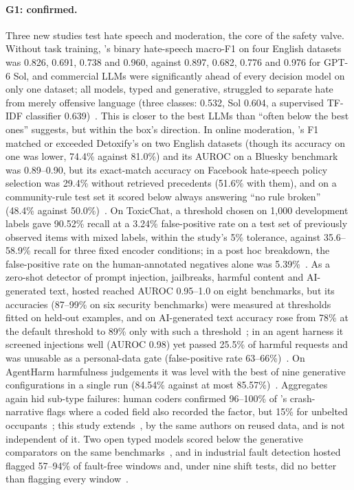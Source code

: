 \paragraph{G1: confirmed.}
Three new studies test hate speech and moderation, the core of the safety valve.
Without task training, \jev{}'s binary hate-speech macro-F1 on four English datasets was 0.826, 0.691, 0.738 and 0.960, against 0.897, 0.682, 0.776 and 0.976 for GPT-6 Sol, and commercial LLMs were significantly ahead of every decision model on only one dataset; all models, typed and generative, struggled to separate hate from merely offensive language (three classes: \jev{} 0.532, Sol 0.604, a supervised TF-IDF classifier 0.639)~\cite{arx03324}.
This is closer to the best LLMs than ``often below the best ones'' suggests, but within the box's direction.
In online moderation, \jev{}'s F1 matched or exceeded Detoxify's on two English datasets (though its accuracy on one was lower, 74.4\% against 81.0\%) and its AUROC on a Bluesky benchmark was 0.89--0.90, but its exact-match accuracy on Facebook hate-speech policy selection was 29.4\% without retrieved precedents (51.6\% with them), and on a community-rule test set it scored below always answering ``no rule broken'' (48.4\% against 50.0\%)~\cite{arx07953}.
On ToxicChat, a threshold chosen on 1{,}000 development labels gave 90.52\% recall at a 3.24\% false-positive rate on a test set of previously observed items with mixed labels, within the study's 5\% tolerance, against 35.6--58.9\% recall for three fixed encoder conditions; in a post hoc breakdown, the false-positive rate on the human-annotated negatives alone was 5.39\%~\cite{zen23075657}\zmark{}.
As a zero-shot detector of prompt injection, jailbreaks, harmful content and AI-generated text, hosted \jev{} reached AUROC 0.95--1.0 on eight benchmarks, but its accuracies (87--99\% on six security benchmarks) were measured at thresholds fitted on held-out examples, and on AI-generated text accuracy rose from 78\% at the default threshold to 89\% only with such a threshold~\cite{arx04985}; in an agent harness it screened injections well (AUROC 0.98) yet passed 25.5\% of harmful requests and was unusable as a personal-data gate (false-positive rate 63--66\%)~\cite{arx02267}.
On AgentHarm harmfulness judgements it was level with the best of nine generative configurations in a single run (84.54\% against at most 85.57\%)~\cite{arx03935}.
Aggregates again hid sub-type failures: human coders confirmed 96--100\% of \jev{}'s crash-narrative flags where a coded field also recorded the factor, but 15\% for unbelted occupants~\cite{arx10321}; this study extends~\cite{arx24052}, by the same authors on reused data, and is not independent of it.
Two open typed models scored below the generative comparators on the same benchmarks~\cite{arx06744,arx07177}, and in industrial fault detection hosted \jev{} flagged 57--94\% of fault-free windows and, under nine shift tests, did no better than flagging every window~\cite{arx09937}.

